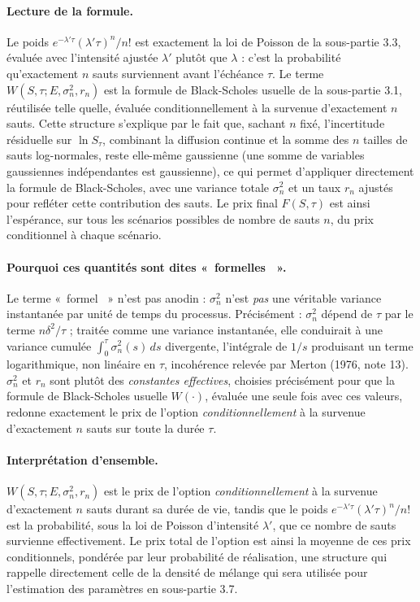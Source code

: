 \documentclass{article}
\providecommand{\og}{«~}
\providecommand{\fg}{~»}
\begin{document}
\paragraph{Lecture de la formule.} Le poids $e^{-\lambda'\tau}(\lambda'\tau)^n/n!$ est exactement la loi de Poisson de la sous-partie 3.3, évaluée avec l'intensité ajustée $\lambda'$ plutôt que $\lambda$ : c'est la probabilité qu'exactement $n$ sauts surviennent avant l'échéance $\tau$. Le terme $W(S,\tau;E,\sigma_n^2,r_n)$ est la formule de Black-Scholes usuelle de la sous-partie 3.1, réutilisée telle quelle, évaluée conditionnellement à la survenue d'exactement $n$ sauts. Cette structure s'explique par le fait que, sachant $n$ fixé, l'incertitude résiduelle sur $\ln S_\tau$, combinant la diffusion continue et la somme des $n$ tailles de sauts log-normales, reste elle-même gaussienne (une somme de variables gaussiennes indépendantes est gaussienne), ce qui permet d'appliquer directement la formule de Black-Scholes, avec une variance totale $\sigma_n^2$ et un taux $r_n$ ajustés pour refléter cette contribution des sauts. Le prix final $F(S,\tau)$ est ainsi l'espérance, sur tous les scénarios possibles de nombre de sauts $n$, du prix conditionnel à chaque scénario.
\paragraph{Pourquoi ces quantités sont dites \og formelles \fg.} Le terme \og formel \fg{} n'est pas anodin : $\sigma_n^2$ n'est \emph{pas} une véritable variance instantanée par unité de temps du processus. Précisément : $\sigma_n^2$ dépend de $\tau$ par le terme $n\delta^2/\tau$ ; traitée comme une variance instantanée, elle conduirait à une variance cumulée $\int_0^\tau\sigma_n^2(s)\,ds$ divergente, l'intégrale de $1/s$ produisant un terme logarithmique, non linéaire en $\tau$, incohérence relevée par Merton (1976, note 13). $\sigma_n^2$ et $r_n$ sont plutôt des \emph{constantes effectives}, choisies précisément pour que la formule de Black-Scholes usuelle $W(\cdot)$, évaluée une seule fois avec ces valeurs, redonne exactement le prix de l'option \emph{conditionnellement} à la survenue d'exactement $n$ sauts sur toute la durée $\tau$.
\paragraph{Interprétation d'ensemble.} $W(S,\tau;E,\sigma_n^2,r_n)$ est le prix de l'option \emph{conditionnellement} à la survenue d'exactement $n$ sauts durant sa durée de vie, tandis que le poids $e^{-\lambda'\tau}(\lambda'\tau)^n/n!$ est la probabilité, sous la loi de Poisson d'intensité $\lambda'$, que ce nombre de sauts survienne effectivement. Le prix total de l'option est ainsi la moyenne de ces prix conditionnels, pondérée par leur probabilité de réalisation, une structure qui rappelle directement celle de la densité de mélange qui sera utilisée pour l'estimation des paramètres en sous-partie 3.7.
\end{document}
